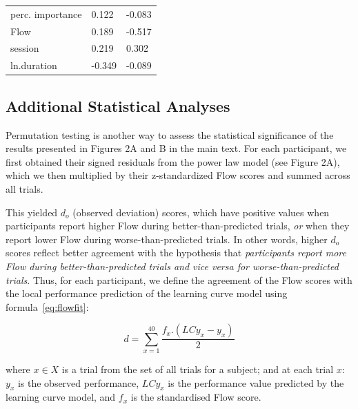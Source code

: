 \documentclass{article}
\begin{document}
\begin{minipage}{\textwidth}
\begin{minipage}{.4\textwidth}
\begin{tabular}{lll}
perc. importance & 0.122  & -0.083 \\
Flow             & 0.189  & -0.517 \\
session          & 0.219  & 0.302  \\
ln.duration      & -0.349 & -0.089
\end{tabular}
\end{minipage}
\end{minipage}

\subsection*{Additional Statistical Analyses}

Permutation testing is another way to assess the statistical significance of the results presented in Figures 2A and B in the main text. For each participant, we first obtained their signed residuals from the power law model (see Figure 2A), which we then multiplied by their z-standardized Flow scores and summed across all trials.

This yielded $d_o$ (observed deviation) scores, which have positive values when participants report higher Flow during better-than-predicted trials, {\it or} when they report lower Flow during worse-than-predicted trials. In other words, higher $d_o$ scores reflect better agreement with the hypothesis that {\it participants report more Flow during better-than-predicted trials and vice versa for worse-than-predicted trials}. Thus, for each participant, we define the agreement of the Flow scores with the local performance prediction of the learning curve model using formula~\ref{eq:flowfit}:

\begin{equation}
	\label{eq:flowfit}
	d = \sum_{x=1}^{40} \frac{f_x.(LCy_x - y_x)}{2}
\end{equation}

where $x\in X$ is a trial from the set of all trials for a subject; and at each trial $x$: $y_x$ is the observed performance, $LCy_x$ is the performance value predicted by the learning curve model, and $f_x$ is the standardised Flow score.
\end{document}
